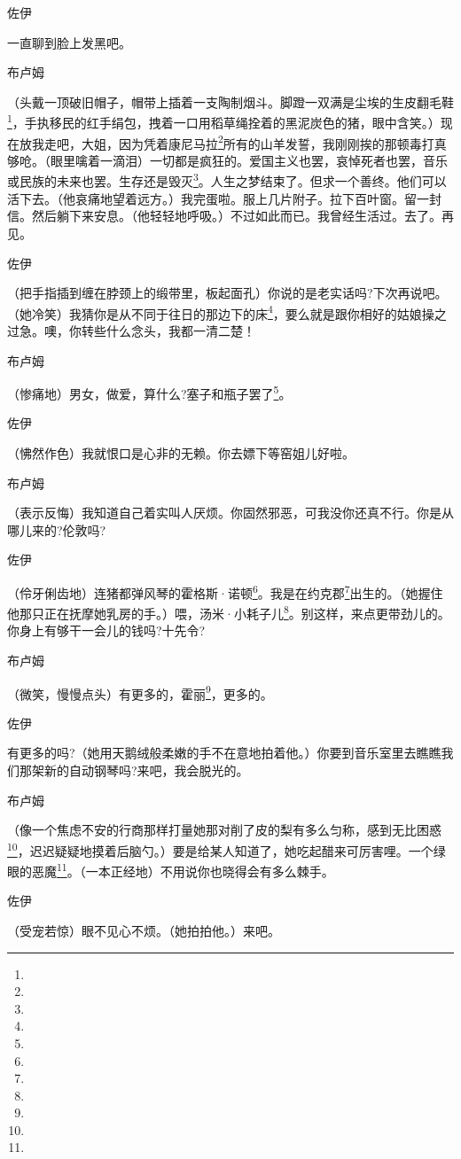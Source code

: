 \par 佐伊
\par 一直聊到脸上发黑吧。
\par 布卢姆
\par （头戴一顶破旧帽子，帽带上插着一支陶制烟斗。脚蹬一双满是尘埃的生皮翻毛鞋\footnote{}，手执移民的红手绢包，拽着一口用稻草绳拴着的黑泥炭色的猪，眼中含笑。）现在放我走吧，大姐，因为凭着康尼马拉\footnote{}所有的山羊发誓，我刚刚挨的那顿毒打真够呛。（眼里噙着一滴泪）一切都是疯狂的。爱国主义也罢，哀悼死者也罢，音乐或民族的未来也罢。生存还是毁灭\footnote{}。人生之梦结束了。但求一个善终。他们可以活下去。（他哀痛地望着远方。）我完蛋啦。服上几片附子。拉下百叶窗。留一封信。然后躺下来安息。（他轻轻地呼吸。）不过如此而已。我曾经生活过。去了。再见。
\par 佐伊
\par （把手指插到缠在脖颈上的缎带里，板起面孔）你说的是老实话吗?下次再说吧。（她冷笑）我猜你是从不同于往日的那边下的床\footnote{}，要么就是跟你相好的姑娘操之过急。噢，你转些什么念头，我都一清二楚！
\par 布卢姆
\par （惨痛地）男女，做爱，算什么?塞子和瓶子罢了\footnote{}。
\par 佐伊
\par （怫然作色）我就恨口是心非的无赖。你去嫖下等窑姐儿好啦。
\par 布卢姆
\par （表示反悔）我知道自己着实叫人厌烦。你固然邪恶，可我没你还真不行。你是从哪儿来的?伦敦吗?
\par 佐伊
\par （伶牙俐齿地）连猪都弹风琴的霍格斯·诺顿\footnote{}。我是在约克郡\footnote{}出生的。（她握住他那只正在抚摩她乳房的手。）喂，汤米·小耗子儿\footnote{}。别这样，来点更带劲儿的。你身上有够干一会儿的钱吗?十先令?
\par 布卢姆
\par （微笑，慢慢点头）有更多的，霍丽\footnote{}，更多的。
\par 佐伊
\par 有更多的吗?（她用天鹅绒般柔嫩的手不在意地拍着他。）你要到音乐室里去瞧瞧我们那架新的自动钢琴吗?来吧，我会脱光的。
\par 布卢姆
\par （像一个焦虑不安的行商那样打量她那对削了皮的梨有多么匀称，感到无比困惑\footnote{}，迟迟疑疑地摸着后脑勺。）要是给某人知道了，她吃起醋来可厉害哩。一个绿眼的恶魔\footnote{}。（一本正经地）不用说你也晓得会有多么棘手。
\par 佐伊
\par （受宠若惊）眼不见心不烦。（她拍拍他。）来吧。

